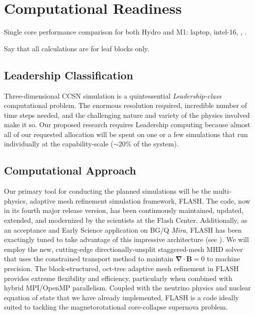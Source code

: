 \section{Computational Readiness}

Single core performance comparison for both Hydro and M1: laptop, intel-16, \mira, \thet.

Say that all calculations are for leaf blocks only.

\subsection{Leadership Classification}
Three-dimensional CCSN simulation is a quintessential {\it
  Leadership-class} computational problem. The enormous resolution
required, incredible number of time steps needed, and the challenging
nature and variety of the physics involved make it so. Our proposed
research requires Leadership computing because almost all of our requested allocation
will be spent on one or a few simulations that run individually at the
capability-scale ($\sim20\%$ of the system).

\subsection{Computational Approach}
\label{sec:approach}

Our primary tool for conducting the planned simulations will be the multi-physics, adaptive mesh refinement simulation framework, FLASH.
The code, now in its fourth major release version, has been continuously maintained, updated, extended, and modernized by the scientists at the Flash Center.
Additionally, as an acceptance and Early Science application on BG/Q {\it Mira}, FLASH has been exactingly tuned to take advantage of this impressive architecture (see \citet{Daley:2013esp}).
We will employ the new, cutting-edge directionally-unsplit staggered-mesh MHD solver \citep{Lee:2013cd} that uses the constrained transport method to maintain $\pmb{\nabla \cdot B} = 0$ to machine precision.
The block-structured, oct-tree adaptive mesh refinement in FLASH provides extreme flexibility and efficiency, particularly when combined with hybrid MPI/OpenMP parallelism.
Coupled with the neutrino physics and nuclear equation of state that we have already implemented, FLASH is a code ideally suited to tackling the magnetorotational core-collapse supernova problem.

